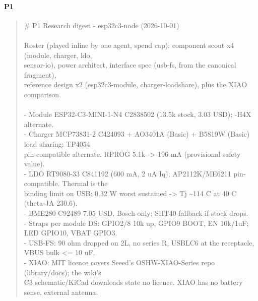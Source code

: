 \documentclass[11pt]{article}
\begin{document}
\paragraph*{P1}
\begin{quote}\small\ttfamily\raggedright
\# P1 Research digest - esp32c3-node (2026-10-01)\\
~\\
Roster (played inline by one agent, spend cap): component scout x4 (module, charger, ldo,\\
sensor-io), power architect, interface spec (usb-fs, from the canonical fragment),\\
reference design x2 (esp32c3-module, charger-loadshare), plus the XIAO comparison.\\
~\\
- Module ESP32-C3-MINI-1-N4 C2838502 (13.5k stock, 3.03 USD); -H4X alternate.\\
- Charger MCP73831-2 C424093 + AO3401A (Basic) + B5819W (Basic) load sharing; TP4054\\
  pin-compatible alternate. RPROG 5.1k -\textgreater{} 196 mA (provisional safety value).\\
- LDO RT9080-33 C841192 (600 mA, 2 uA Iq); AP2112K/ME6211 pin-compatible. Thermal is the\\
  binding limit on USB: 0.32 W worst sustained -\textgreater{} Tj \textasciitilde{}114 C at 40 C (theta-JA 230.6).\\
- BME280 C92489 7.05 USD, Bosch-only; SHT40 fallback if stock drops.\\
- Straps per module DS: GPIO2/8 10k up, GPIO9 BOOT, EN 10k/1uF; LED GPIO10, VBAT GPIO3.\\
- USB-FS: 90 ohm dropped on 2L, no series R, USBLC6 at the receptacle, VBUS bulk \textless{}= 10 uF.\\
- XIAO: MIT licence covers Seeed's OSHW-XIAO-Series repo (library/docs); the wiki's\\
  C3 schematic/KiCad downloads state no licence. XIAO has no battery sense, external antenna.
\end{quote}
\end{document}
